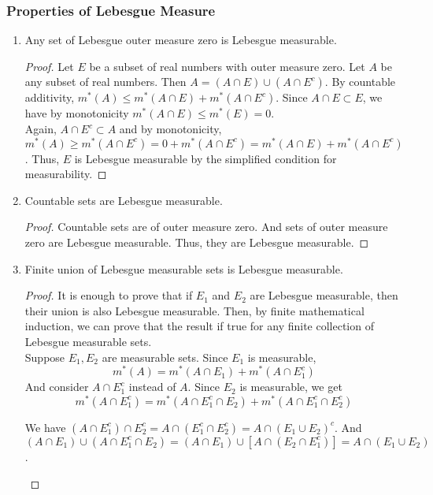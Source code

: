 \subsubsection{Properties of Lebesgue Measure}
\begin{enumerate}
	\item Any set of Lebesgue outer measure zero is Lebesgue measurable.
	\begin{proof}
		Let $E$ be a subset of real numbers with outer measure zero.
		Let $A$ be any subset of real numbers.
		Then $A = (A \cap E) \cup (A \cap E^c)$.
		By countable additivity, $m^\ast(A) \le m^\ast(A \cap E) + m^\ast(A \cap E^c)$.
		Since $A\cap E \subset E$, we have by monotonicity $m^\ast(A \cap E) \le m^\ast(E) = 0$.\\


		Again, $A \cap E^c \subset A$ and by monotonicity, $m^\ast(A) \ge m^\ast(A \cap E^c) = 0+m^\ast(A \cap E^c) = m^\ast(A\cap E) + m^\ast(A \cap E^c)$.
		Thus, $E$ is Lebesgue measurable by the simplified condition for measurability.
	\end{proof}

	\item Countable sets are Lebesgue measurable.
	\begin{proof}
	Countable sets are of outer measure zero.
	And sets of outer measure zero are Lebesgue measurable.
	Thus, they are Lebesgue measurable.
	\end{proof}
	\item Finite union of Lebesgue measurable sets is Lebesgue measurable.
	\begin{proof}
		It is enough to prove that if $E_1$ and $E_2$ are Lebesgue measurable, then their union is also Lebesgue measurable.
		Then, by finite mathematical induction, we can prove that the result if true for any finite collection of Lebesgue measurable sets.\\


	Suppose $E_1, E_2$ are measurable sets.
	Since $E_1$ is measurable,
	\begin{equation}
		m^\ast(A) = m^\ast(A \cap E_1) + m^\ast(A \cap E_1^c)
	\end{equation}
	And consider $A \cap E_1^c$ instead of $A$.
	Since $E_2$ is measurable, we get
	\begin{equation}
		m^\ast(A \cap E_1^c) = m^\ast(A \cap E_1^c\cap  E_2) + m^\ast(A \cap E_1^c \cap E_2^c)
	\end{equation}

	We have $(A \cap E_1^c) \cap E_2^c = A \cap (E_1^c \cap E_2^c) = A \cap (E_1 \cup E_2)^c$.
	And $(A \cap E_1) \cup (A \cap E_1^c \cap E_2) = (A \cap E_1) \cup [A \cap (E_2 \cap E_1^c)] = A \cap (E_1 \cup E_2)$.
\begin{center}
\end{center}
\end{proof}
\end{enumerate}
